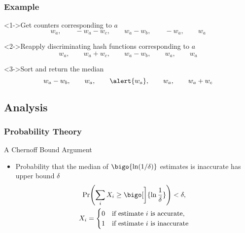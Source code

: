 \begin{frame}
  \frametitle{Example}

  \begin{block}<1->{Get counters corresponding to \( a \)}
    \begin{equation*}
      w_{a}, \qquad -w_{a} - w_{c}, \qquad w_{a} - w_{b}, \qquad -w_{a}, \qquad w_{a}
    \end{equation*}
  \end{block}

  \begin{block}<2->{Reapply discriminating hash functions corresponding to \( a \)}
    \begin{equation*}
      w_{a}, \qquad w_{a} + w_{c}, \qquad w_{a} - w_{b}, \qquad w_{a}, \qquad w_{a}
    \end{equation*}
  \end{block}

  \begin{block}<3->{Sort and return the median}
    \begin{equation*}
      w_{a} - w_{b}, \qquad w_{a}, \qquad \alert{w_{a}}, \qquad w_{a}, \qquad w_{a} + w_{c}
    \end{equation*}
  \end{block}
\end{frame}

\subsection{Analysis}

\begin{frame}
  \frametitle{Probability Theory}

  \begin{block}{A Chernoff Bound Argument}
    \begin{itemize}
      \item Probability that the median of \( \bigo{\ln (1 / \delta)} \) estimates is inaccurate has upper bound \( \delta \)
      \begin{multline*}
        \probability \Biggl( \sum_{i} X_{i} \geq \bigo[\bigg]{\ln \frac{1}{\delta}} \Biggr) < \delta, \\
        X_{i} = \begin{cases}
          0 & \text{if estimate~\( i \) is accurate,} \\
          1 & \text{if estimate~\( i \) is inaccurate}
        \end{cases}
      \end{multline*}
    \end{itemize}
  \end{block}
\end{frame}

